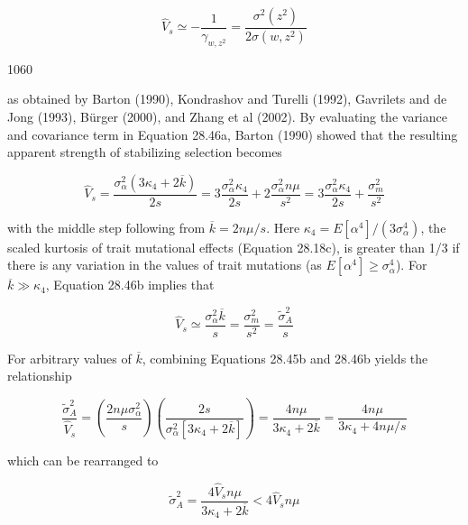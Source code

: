 \documentclass{article}
\begin{document}
\begin{equation}
\widehat{V}_{s}\simeq-\frac{1}{\gamma_{w,z^{2}}}=\frac{\sigma^{2}(z^{2})}{2\sigma(w,z^{2})}
\tag{28.46a}
\label{eq:28_46a}
\end{equation}

1060

as obtained by Barton (1990), Kondrashov and Turelli (1992), Gavrilets and de Jong (1993), Bürger (2000), and Zhang et al (2002). By evaluating the variance and covariance term in Equation 28.46a, Barton (1990) showed that the resulting apparent strength of stabilizing selection becomes

\begin{equation}
\widehat{V}_{s}=\frac{\sigma_{\alpha}^{2}(3\kappa_{4}+2\overline{k})}{2s}=3\frac{\sigma_{\alpha}^{2}\kappa_{4}}{2s}+2\frac{\sigma_{\alpha}^{2}n\mu}{s^{2}}=3\frac{\sigma_{\alpha}^{2}\kappa_{4}}{2s}+\frac{\sigma_{m}^{2}}{s^{2}}
\tag{28.46b}
\label{eq:28_46b}
\end{equation}

with the middle step following from  $ \overline{k} = 2n\mu/s $. Here  $ \kappa_4 = E[\alpha^4]/(3\sigma_\alpha^4) $, the scaled kurtosis of trait mutational effects (Equation 28.18c), is greater than 1/3 if there is any variation in the values of trait mutations (as  $ E[\alpha^4] \geq \sigma_\alpha^4 $). For  $ \overline{k} \gg \kappa_4 $, Equation 28.46b implies that

\begin{equation}
\widehat{V}_{s}\simeq\frac{\sigma_{\alpha}^{2}\overline{k}}{s}=\frac{\sigma_{m}^{2}}{s^{2}}=\frac{\widetilde{\sigma}_{A}^{2}}{s}
\tag{28.46c}
\label{eq:28_46c}
\end{equation}

For arbitrary values of  $ \overline{k} $, combining Equations 28.45b and 28.46b yields the relationship

\begin{equation}
\frac{\widetilde{\sigma}_{A}^{2}}{\widehat{V}_{s}}=\left(\frac{2n\mu\sigma_{\alpha}^{2}}{s}\right)\left(\frac{2s}{\sigma_{\alpha}^{2}[3\kappa_{4}+2\overline{k}]}\right)=\frac{4n\mu}{3\kappa_{4}+2\overline{k}}=\frac{4n\mu}{3\kappa_{4}+4n\mu/s}
\tag{28.46d}
\label{eq:28_46d}
\end{equation}

which can be rearranged to

\begin{equation}
\widetilde{\sigma}_{A}^{2}=\frac{4\widehat{V}_{s}n\mu}{3\kappa_{4}+2\overline{k}}<4\widehat{V}_{s}n\mu
\tag{28.46e}
\label{eq:28_46e}
\end{equation}
\end{document}
